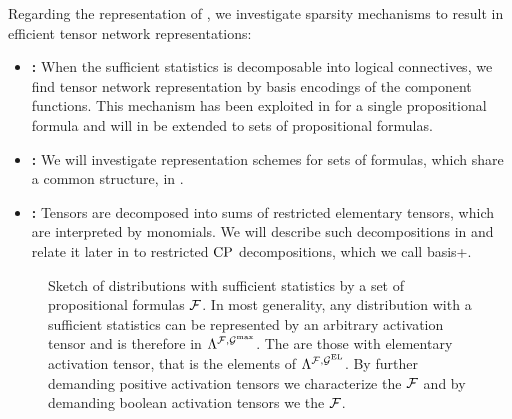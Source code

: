 Regarding the representation of \HybridLogicNetworks{}, we investigate sparsity mechanisms to result in efficient tensor network representations:
\begin{itemize}
	\item \textbf{\DecompositionSparsity{}:} When the sufficient statistics is decomposable into logical connectives, we find tensor network representation by basis encodings of the component functions.
    This mechanism has been exploited in  for a single propositional formula and will in  be extended to sets of propositional formulas.
    \item \textbf{\SelectionSparsity{}:} We will investigate representation schemes for sets of formulas, which share a common structure, in .
    \item \textbf{\PolynomialSparsity{}:} Tensors are decomposed into sums of restricted elementary tensors, which are interpreted by monomials.
    We will describe such decompositions in  and relate it later in  to restricted $\mathrm{CP}$ decompositions, which we call basis+.
\end{itemize}

\begin{figure}[t]
    \begin{center}
        
    \end{center}
    \caption{Sketch of distributions with sufficient statistics by a set of propositional formulas $\mathcal{F}$.
    In most generality, any distribution with a sufficient statistics can be represented by an arbitrary activation tensor and is therefore in $\Lambda^{\mathcal{F},\mathcal{G}^{\mathrm{max}}}$.
    The \HybridLogicNetworks{} are those with elementary activation tensor, that is the elements of $\Lambda^{\mathcal{F},\mathcal{G}^{\mathrm{EL}}}$.
    By further demanding positive activation tensors we characterize the \MarkovLogicNetworks{} $\mathcal{F}$ and by demanding boolean activation tensors we the \HardLogicNetworks{} $\mathcal{F}$.
    }
    \label{fig:elementaryComputableSketch}
\end{figure}


